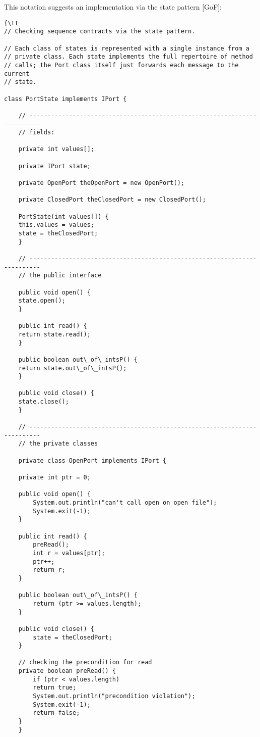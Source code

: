 \documentclass[11pt]{article}
\begin{document}
This notation suggests an implementation via the state pattern [GoF]:


\begin{verbatim}
{\tt 
// Checking sequence contracts via the state pattern. 

// Each class of states is represented with a single instance from a 
// private class. Each state implements the full repertoire of method 
// calls; the Port class itself just forwards each message to the current 
// state. 

class PortState implements IPort {

    // -------------------------------------------------------------------------
    // fields: 

    private int values[]; 

    private IPort state; 

    private OpenPort theOpenPort = new OpenPort(); 

    private ClosedPort theClosedPort = new ClosedPort(); 

    PortState(int values[]) { 
	this.values = values; 
	state = theClosedPort;
    }

    // -------------------------------------------------------------------------
    // the public interface 

    public void open() { 
	state.open(); 
    }

    public int read() {
	return state.read();
    }

    public boolean out\_of\_intsP() {
	return state.out\_of\_intsP(); 
    }

    public void close() {
	state.close();
    }	

    // -------------------------------------------------------------------------
    // the private classes 

    private class OpenPort implements IPort {

	private int ptr = 0; 

	public void open() { 
	    System.out.println("can't call open on open file"); 
	    System.exit(-1); 
	}

	public int read() {
	    preRead();          
	    int r = values[ptr]; 
	    ptr++; 
	    return r; 
	}

	public boolean out\_of\_intsP() {
	    return (ptr >= values.length); 
	}

	public void close() {
	    state = theClosedPort; 
	}	

	// checking the precondition for read
	private boolean preRead() { 
	    if (ptr < values.length)
		return true; 
	    System.out.println("precondition violation"); 
	    System.exit(-1); 
	    return false; 
	}
    }


\end{verbatim}
\end{document}
